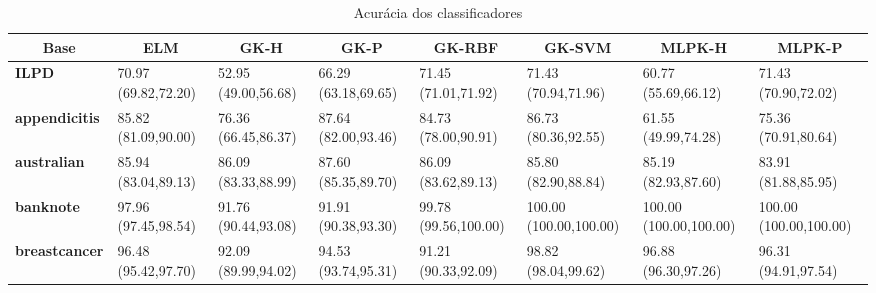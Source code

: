 \documentclass[conference]{IEEEtran}
\begin{document}
	\begin{table*}[thpbh]
		\caption{Acurácia dos classificadores}
		\label{tab:results}
		\begin{adjustbox}{width=1\textwidth}
			
		\begin{tabular}{@{}cccccccc@{}}
			\toprule
			\textbf{Base}                               & \textbf{ELM}                             & \textbf{GK-H}                            & \textbf{GK-P}                            & \textbf{GK-RBF}                           & \textbf{GK-SVM}                             & \textbf{MLPK-H}                             & \textbf{MLPK-P}                             \\ \midrule
			\multicolumn{1}{|l|}{\textbf{ILPD}}         & \multicolumn{1}{l|}{70.97 (69.82,72.20)} & \multicolumn{1}{l|}{52.95 (49.00,56.68)} & \multicolumn{1}{l|}{66.29 (63.18,69.65)} & \multicolumn{1}{l|}{71.45 (71.01,71.92)}  & \multicolumn{1}{l|}{71.43 (70.94,71.96)}    & \multicolumn{1}{l|}{60.77 (55.69,66.12)}    & \multicolumn{1}{l|}{71.43 (70.90,72.02)}    \\ \midrule
			\multicolumn{1}{|l|}{\textbf{appendicitis}} & \multicolumn{1}{l|}{85.82 (81.09,90.00)} & \multicolumn{1}{l|}{76.36 (66.45,86.37)} & \multicolumn{1}{l|}{87.64 (82.00,93.46)} & \multicolumn{1}{l|}{84.73 (78.00,90.91)}  & \multicolumn{1}{l|}{86.73 (80.36,92.55)}    & \multicolumn{1}{l|}{61.55 (49.99,74.28)}    & \multicolumn{1}{l|}{75.36 (70.91,80.64)}    \\ \midrule
			\multicolumn{1}{|l|}{\textbf{australian}}   & \multicolumn{1}{l|}{85.94 (83.04,89.13)} & \multicolumn{1}{l|}{86.09 (83.33,88.99)} & \multicolumn{1}{l|}{87.60 (85.35,89.70)} & \multicolumn{1}{l|}{86.09 (83.62,89.13)}  & \multicolumn{1}{l|}{85.80 (82.90,88.84)}    & \multicolumn{1}{l|}{85.19 (82.93,87.60)}    & \multicolumn{1}{l|}{83.91 (81.88,85.95)}    \\ \midrule
			\multicolumn{1}{|l|}{\textbf{banknote}}     & \multicolumn{1}{l|}{97.96 (97.45,98.54)} & \multicolumn{1}{l|}{91.76 (90.44,93.08)} & \multicolumn{1}{l|}{91.91 (90.38,93.30)} & \multicolumn{1}{l|}{99.78 (99.56,100.00)} & \multicolumn{1}{l|}{100.00 (100.00,100.00)} & \multicolumn{1}{l|}{100.00 (100.00,100.00)} & \multicolumn{1}{l|}{100.00 (100.00,100.00)} \\ \midrule
			\multicolumn{1}{|l|}{\textbf{breastcancer}} & \multicolumn{1}{l|}{96.48 (95.42,97.70)} & \multicolumn{1}{l|}{92.09 (89.99,94.02)} & \multicolumn{1}{l|}{94.53 (93.74,95.31)} & \multicolumn{1}{l|}{91.21 (90.33,92.09)}  & \multicolumn{1}{l|}{98.82 (98.04,99.62)}    & \multicolumn{1}{l|}{96.88 (96.30,97.26)}    & \multicolumn{1}{l|}{96.31 (94.91,97.54)}    \\ \midrule

\end{tabular}
\end{adjustbox}
\end{table*}
\end{document}
